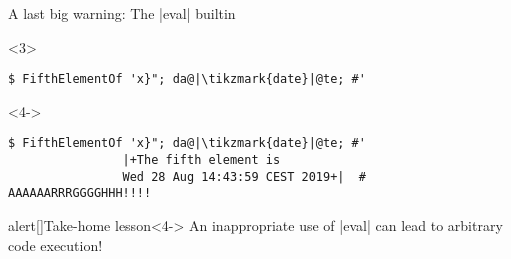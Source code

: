 \begin{frame}[fragile]{A last big warning: The \bash|eval| builtin}
\begin{overlayarea}{\textwidth}{0.64\textheight}
\begin{onlyenv}
        \end{onlyenv}
        \begin{onlyenv}<3>
            \begin{lstlisting}[style=MyBash, emph={[7]_fifth_array}, aboveskip=2mm, firstnumber=10]
                $ FifthElementOf 'x}"; da@|\tikzmark{date}|@te; #'
            \end{lstlisting}
        \end{onlyenv}
        \begin{onlyenv}<4->
            \begin{lstlisting}[style=MyBash, emph={[7]_fifth_array}, aboveskip=2mm, firstnumber=10]
                $ FifthElementOf 'x}"; da@|\tikzmark{date}|@te; #'
                |+The fifth element is
                Wed 28 Aug 14:43:59 CEST 2019+|  # AAAAAARRRGGGGHHH!!!!
            \end{lstlisting}
        \end{onlyenv}
    \end{overlayarea}
    {\Large\begin{varblock}{alert}[\textwidth]{Take-home lesson}<4->
        An inappropriate use of \bash|eval| can lead to \alert{arbitrary code execution}!
    \end{varblock}}
\end{frame}






